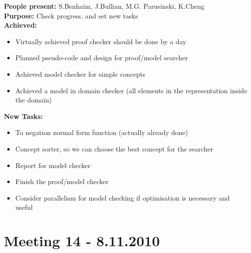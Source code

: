 \documentclass[12pt]{article}
\begin{document}
\textbf{People present:} S.Benhaim, J.Bullian, M.G. Parusinski, K.Cheng \\
\textbf{Purpose:} Check progress, and set new tasks \\
\textbf{Achieved:}
\begin{itemize}
\item Virtually achieved proof checker should be done by a day
\item Planned pseudo-code and design for proof/model searcher
\item Achieved model checker for simple concepts
\item Achieved a model in domain checker (all elements in the representation inside the domain)
\end{itemize}
\textbf{New Tasks:}
\begin{itemize}
\item To negation normal form function (actually already done)
\item Concept sorter, so we can choose the best concept for the searcher
\item Report for model checker
\item Finish the proof/model checker
\item Consider parallelism for model checking if optimisation is necessary and useful
\end{itemize}

\section*{Meeting 14 - 8.11.2010}
\end{document}
